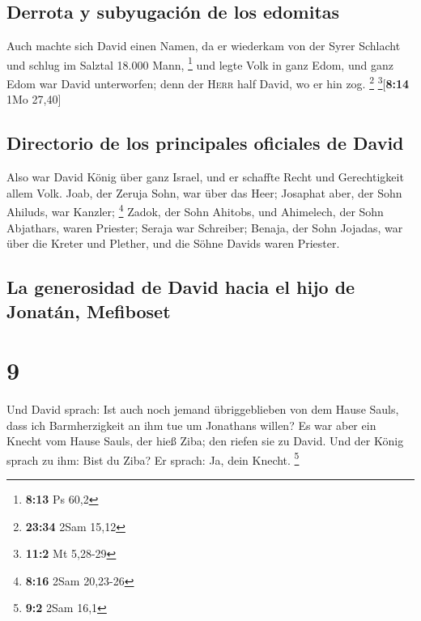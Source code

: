 \hypertarget{derrota-y-subyugaciuxf3n-de-los-edomitas}{%
\subsection{Derrota y subyugación de los
edomitas}\label{derrota-y-subyugaciuxf3n-de-los-edomitas}}

 Auch machte sich David einen Namen, da er wiederkam von
der Syrer Schlacht und schlug im Salztal 18.000 Mann, \footnote{\textbf{8:13}
  Ps 60,2}  und legte Volk in ganz Edom, und ganz Edom
war David unterworfen; denn der \textsc{Herr} half David, wo er hin zog.
\footnote{\textbf{23:34} 2Sam 15,12} \footnote{\textbf{11:2} Mt 5,28-29}{[}\textbf{8:14}
1Mo 27,40{]}

\hypertarget{directorio-de-los-principales-oficiales-de-david}{%
\subsection{Directorio de los principales oficiales de
David}\label{directorio-de-los-principales-oficiales-de-david}}

 Also war David König über ganz Israel, und er schaffte
Recht und Gerechtigkeit allem Volk.  Joab, der Zeruja
Sohn, war über das Heer; Josaphat aber, der Sohn Ahiluds, war Kanzler;
\footnote{\textbf{8:16} 2Sam 20,23-26}  Zadok, der Sohn
Ahitobs, und Ahimelech, der Sohn Abjathars, waren Priester; Seraja war
Schreiber;  Benaja, der Sohn Jojadas, war über die Kreter
und Plether, und die Söhne Davids waren Priester.

\hypertarget{la-generosidad-de-david-hacia-el-hijo-de-jonatuxe1n-mefiboset}{%
\subsection{La generosidad de David hacia el hijo de Jonatán,
Mefiboset}\label{la-generosidad-de-david-hacia-el-hijo-de-jonatuxe1n-mefiboset}}

\hypertarget{section-8}{%
\section{9}\label{section-8}}

 Und David sprach: Ist auch noch jemand übriggeblieben von
dem Hause Sauls, dass ich Barmherzigkeit an ihm tue um Jonathans willen?
 Es war aber ein Knecht vom Hause Sauls, der hieß Ziba;
den riefen sie zu David. Und der König sprach zu ihm: Bist du Ziba? Er
sprach: Ja, dein Knecht. \footnote{\textbf{9:2} 2Sam 16,1}

